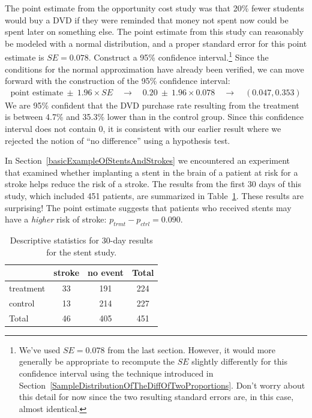 \begin{example}{The point estimate from the opportunity cost study was that 20\% fewer students would buy a DVD if they were reminded that money not spent now could be spent later on something else. The point estimate from this study can reasonably be modeled with a normal distribution, and a proper standard error for this point estimate is $SE = 0.078$. Construct a 95\% confidence interval.\footnote{We've used $SE = 0.078$ from the last section. However, it would more generally be appropriate to recompute the $SE$ slightly differently for this confidence interval using the technique introduced in Section~\ref{SampleDistributionOfTheDiffOfTwoProportions}. Don't worry about this detail for now since the two resulting standard errors are, in this case, almost identical.}}
Since the conditions for the normal approximation have already been verified, we can move forward with the construction of the 95\% confidence interval:
\begin{align*}
\text{point estimate}\ \pm\ 1.96 \times SE \quad \rightarrow \quad
0.20\ \pm\ 1.96 \times 0.078 \quad \rightarrow \quad
(0.047, 0.353)
\end{align*}
We are 95\% confident that the DVD purchase rate resulting from the treatment is between 4.7\% and 35.3\% lower than in the control group. Since this confidence interval does not contain 0, it is consistent with our earlier result where we rejected the notion of ``no difference'' using a hypothesis test.
\end{example}

In Section~\ref{basicExampleOfStentsAndStrokes} we encountered an experiment that examined whether implanting a stent in the brain of a patient at risk for a stroke helps reduce the risk of a stroke. The results from the first 30 days of this study, which included 451 patients, are summarized in Table~\ref{stentStudyResultsCIsection}. These results are surprising! The point estimate suggests that patients who received stents may have a \emph{higher} risk of stroke: $p_{trmt} - p_{ctrl} = 0.090$.

\begin{table}[h]
\centering
\begin{tabular}{l cc c}
  \hline
	& 	stroke 	& no event & Total \\
  \hline
treatment 	& 33		& 191	& 224 \\
control 	& 13		& 214	& 227 \\
  \hline
Total		& 46		& 405	& 451 \\
  \hline
\end{tabular}
\caption{Descriptive statistics for 30-day results for the stent study.}
\label{stentStudyResultsCIsection}
\end{table}


